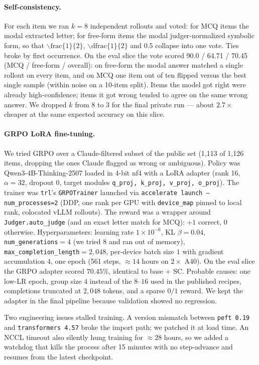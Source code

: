 \documentclass{article}
\begin{document}
\paragraph{Self-consistency.}
For each item we ran $k=8$ independent rollouts and voted: for
MCQ items the modal extracted letter; for free-form items the modal
judger-normalized symbolic form, so that
$\backslash\text{frac}\{1\}\{2\}$,
$\backslash\text{dfrac}\{1\}\{2\}$ and $0.5$ collapse into one
vote. Ties broke by first occurrence. On the eval slice the vote
scored 90.0 / 64.71 / 70.45 (MCQ / free-form / overall): on
free-form the modal answer matched a single rollout on every item,
and on MCQ one item out of ten flipped versus the best single
sample (within noise on a 10-item split). Items the model got right
were already high-confidence; items it got wrong tended to agree on
the same wrong answer. We dropped $k$ from 8 to 3 for the final
private run --- about $2.7\times$ cheaper at the same expected
accuracy on this slice.

\paragraph{GRPO LoRA fine-tuning.}
We tried GRPO \citep{shao2024deepseekmath} over a Claude-filtered
subset of the public set (1{,}113 of 1{,}126 items, dropping the
ones Claude flagged as wrong or ambiguous). Policy was
Qwen3-4B-Thinking-2507 loaded in 4-bit nf4 with a LoRA adapter
(rank 16, $\alpha=32$, dropout 0, target modules
\texttt{q\_proj, k\_proj, v\_proj, o\_proj}). The trainer was
\texttt{trl}'s \texttt{GRPOTrainer} launched via
\texttt{accelerate launch --num\_processes=2} (DDP, one rank per
GPU with \texttt{device\_map} pinned to local rank, colocated vLLM
rollouts). The reward was a wrapper around
\texttt{Judger.auto\_judge} (and an exact letter match for MCQ):
$+1$ correct, $0$ otherwise. Hyperparameters: learning rate
$1\times 10^{-6}$, KL $\beta=0.04$, \texttt{num\_generations}$=4$
(we tried 8 and ran out of memory),
\texttt{max\_completion\_length}$=2{,}048$, per-device batch size
$1$ with gradient accumulation $4$, one epoch (561 steps,
$\approx 14$ hours on $2\times$ A40). On the eval slice the GRPO
adapter scored $70.45\%$, identical to base $+$ SC.
Probable causes: one low-LR epoch, group size $4$ instead of the
$8$--$16$ used in the published recipes, completions truncated at
$2{,}048$ tokens, and a sparse $0/1$ reward. We kept the adapter
in the final pipeline because validation showed no regression.

Two engineering issues stalled training. A version mismatch
between \texttt{peft 0.19} and \texttt{transformers 4.57} broke
the import path; we patched it at load time. An NCCL timeout
also silently hung training for $\approx 28$ hours, so we added
a watchdog that kills the process after 15 minutes with no
step-advance and resumes from the latest checkpoint.
\end{document}
